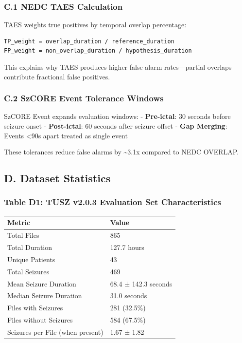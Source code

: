 \documentclass[
]{article}
\begin{document}
\hypertarget{c.1-nedc-taes-calculation}{%
\subsubsection{C.1 NEDC TAES
Calculation}\label{c.1-nedc-taes-calculation}}

TAES weights true positives by temporal overlap percentage:

\begin{verbatim}
TP_weight = overlap_duration / reference_duration
FP_weight = non_overlap_duration / hypothesis_duration
\end{verbatim}

This explains why TAES produces higher false alarm rates---partial
overlaps contribute fractional false positives.

\hypertarget{c.2-szcore-event-tolerance-windows}{%
\subsubsection{C.2 SzCORE Event Tolerance
Windows}\label{c.2-szcore-event-tolerance-windows}}

SzCORE Event expands evaluation windows: - \textbf{Pre-ictal}: 30
seconds before seizure onset - \textbf{Post-ictal}: 60 seconds after
seizure offset - \textbf{Gap Merging}: Events \textless90s apart treated
as single event

These tolerances reduce false alarms by \textasciitilde3.1x compared to
NEDC OVERLAP.

\hypertarget{d.-dataset-statistics}{%
\subsection{D. Dataset Statistics}\label{d.-dataset-statistics}}

\hypertarget{table-d1-tusz-v2.0.3-evaluation-set-characteristics}{%
\subsubsection{Table D1: TUSZ v2.0.3 Evaluation Set
Characteristics}\label{table-d1-tusz-v2.0.3-evaluation-set-characteristics}}

\begin{longtable}[]{@{}ll@{}}
\toprule
Metric & Value\tabularnewline
\midrule
\endhead
Total Files & 865\tabularnewline
Total Duration & 127.7 hours\tabularnewline
Unique Patients & 43\tabularnewline
Total Seizures & 469\tabularnewline
Mean Seizure Duration & 68.4 ± 142.3 seconds\tabularnewline
Median Seizure Duration & 31.0 seconds\tabularnewline
Files with Seizures & 281 (32.5\%)\tabularnewline
Files without Seizures & 584 (67.5\%)\tabularnewline
Seizures per File (when present) & 1.67 ± 1.82\tabularnewline
\bottomrule
\end{longtable}
\end{document}

